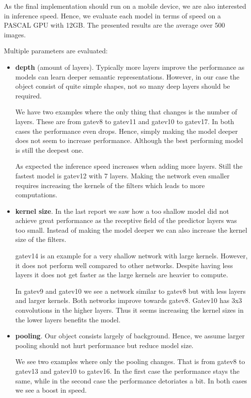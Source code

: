 \documentclass{article}
\begin{document}
As the final implementation should run on a mobile device, we are also interested in inference speed. Hence, we evaluate each model in terms of speed on a PASCAL GPU with 12GB. The presented results are the average over 500 images.

Multiple parameters are evaluated:
\begin{itemize}
	\item \textbf{depth} (amount of layers). Typically more layers improve the performance as models can learn deeper semantic representations. However, in our case the object consist of quite simple shapes, not so many deep layers should be required.
	
	We have two examples where the only thing that changes is the number of layers. These are from gatev8 to gatev11 and gatev10 to gatev17. In both cases the performance even drops. Hence, simply making the model deeper does not seem to increase performance. Although the best performing model is still the deepest one.
	
	As expected the inference speed increases when adding more layers. Still the fastest model is gatev12 with 7 layers. Making the network even smaller requires increasing the kernels of the filters which leads to more computations.
	
	\item \textbf{kernel size}. In the last report we saw how a too shallow model did not achieve great performance as the receptive field of the predictor layers was too small. Instead of making the model deeper we can also increase the kernel size of the filters.
	
	gatev14 is an example for a very shallow network with large kernels. However, it does not perform well compared to other networks. Despite having less layers it does not get faster as the large kernels are heavier to compute.
	
	In gatev9 and gatev10 we see a network similar to gatev8 but with less layers and larger kernels. Both networks improve towards gatev8. Gatev10 has 3x3 convolutions in the higher layers. Thus it seems increasing the kernel sizes in the lower layers benefits the model.
	
	
	\item \textbf{pooling}. Our object consists largely of background. Hence, we assume larger pooling should not hurt performance but reduce model size.
	
	We see two examples where only the pooling changes. That is from gatev8 to gatev13 and gatev10 to gatev16. In the first case the performance stays the same, while in the second case the performance detoriates a bit. In both cases we see a boost in speed.
	

\end{itemize}
\end{document}
